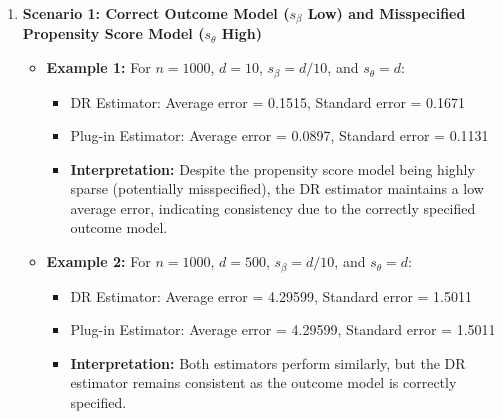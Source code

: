 \documentclass{article}
\begin{document}
\begin{enumerate}
  \item \textbf{Scenario 1: Correct Outcome Model (\( s_\beta \) Low) and Misspecified Propensity Score Model (\( s_\theta \) High)}
    \begin{itemize}
      \item \textbf{Example 1:} For \( n = 1000 \), \( d = 10 \), \( s_\beta = d/10 \), and \( s_\theta = d \):
        \begin{itemize}
          \item DR Estimator: Average error = 0.1515, Standard error = 0.1671
          \item Plug-in Estimator: Average error = 0.0897, Standard error = 0.1131
          \item \textbf{Interpretation:} Despite the propensity score model being highly sparse (potentially misspecified), the DR estimator maintains a low average error, indicating consistency due to the correctly specified outcome model.
        \end{itemize}
      \item \textbf{Example 2:} For \( n = 1000 \), \( d = 500 \), \( s_\beta = d/10 \), and \( s_\theta = d \):
        \begin{itemize}
          \item DR Estimator: Average error = 4.29599, Standard error = 1.5011
          \item Plug-in Estimator: Average error = 4.29599, Standard error = 1.5011
          \item \textbf{Interpretation:} Both estimators perform similarly, but the DR estimator remains consistent as the outcome model is correctly specified.
        \end{itemize}
    \end{itemize}


\end{enumerate}
\end{document}
